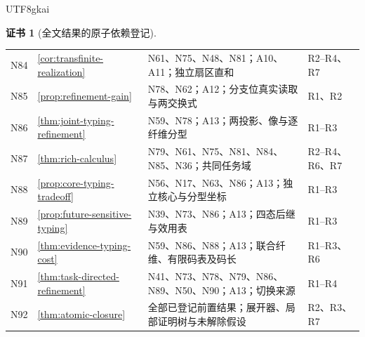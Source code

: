 \documentclass[12pt]{report}
\theoremstyle{definition}
\newtheorem{Certificate}{证书}[chapter]
\begin{document}
\begin{CJK*}{UTF8}{gkai}
\begin{Certificate}[全文结果的原子依赖登记]
\begin{longtable}{p{}p{}p{}p{}}
N84 & \ref{cor:transfinite-realization} & N61、N75、N48、N81；A10、A11；独立扇区直和 & R2--R4、R7\\
N85 & \ref{prop:refinement-gain} & N78、N62；A12；分支位真实读取与两交换式 & R1、R2\\
N86 & \ref{thm:joint-typing-refinement} & N59、N78；A13；两投影、像与逐纤维分型 & R1--R3\\
N87 & \ref{thm:rich-calculus} & N79、N61、N75、N81、\newline N84、N85、N36；共同任务域 & R2--R4、R6、R7\\
N88 & \ref{prop:core-typing-tradeoff} & N56、N17、N63、N86；A13；独立核心与分型坐标 & R1--R3\\
N89 & \ref{prop:future-sensitive-typing} & N39、N73、N86；A13；四态后继与效用表 & R1--R3\\
N90 & \ref{thm:evidence-typing-cost} & N59、N86、N88；A13；联合纤维、有限码表及码长 & R1--R3、R6\\
N91 & \ref{thm:task-directed-refinement} & N41、N73、N78、N79、N86、\newline N89、N50、N90；A13；切换来源 & R1--R4\\
N92 & \ref{thm:atomic-closure} & 全部已登记前置结果；展开器、局部证明树与未解除假设 & R2、R3、R7\\
\bottomrule
\end{longtable}
\normalsize
\end{Certificate}


\end{CJK*}
\end{document}
